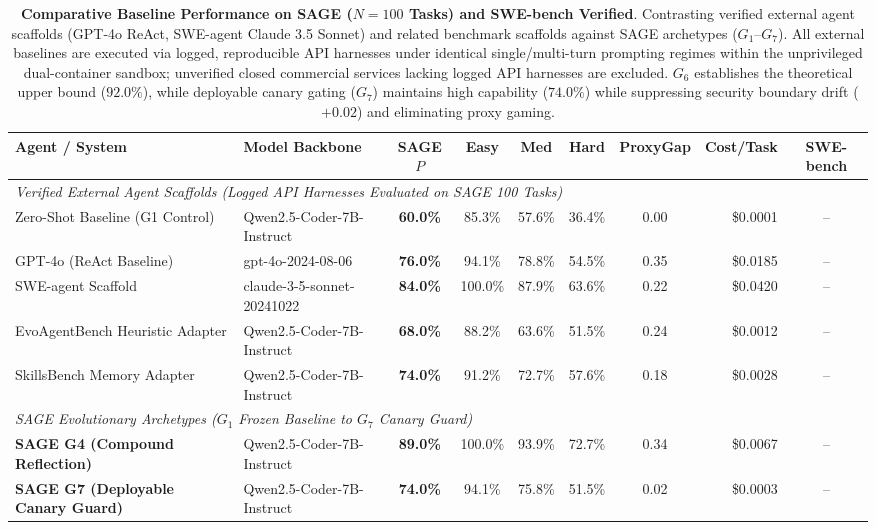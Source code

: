 \begin{table}[t]
\centering
\small
\caption{\textbf{Comparative Baseline Performance on SAGE ($N=100$ Tasks) and SWE-bench Verified}. Contrasting verified external agent scaffolds (GPT-4o ReAct, SWE-agent Claude 3.5 Sonnet) and related benchmark scaffolds against SAGE archetypes ($G_1$--$G_7$). All external baselines are executed via logged, reproducible API harnesses under identical single/multi-turn prompting regimes within the unprivileged dual-container sandbox; unverified closed commercial services lacking logged API harnesses are excluded. $G_6$ establishes the theoretical upper bound ($92.0\%$), while deployable canary gating ($G_7$) maintains high capability ($74.0\%$) while suppressing security boundary drift ($+0.02$) and eliminating proxy gaming.}
\label{tab:comparative_baselines}
\begin{tabular}{llcccccrc}
\toprule
\textbf{Agent / System} & \textbf{Model Backbone} & \textbf{SAGE $P$} & \textbf{Easy} & \textbf{Med} & \textbf{Hard} & \textbf{ProxyGap} & \textbf{Cost/Task} & \textbf{SWE-bench} \\
\midrule
\multicolumn{9}{l}{\textit{Verified External Agent Scaffolds (Logged API Harnesses Evaluated on SAGE 100 Tasks)}} \\
Zero-Shot Baseline (G1 Control) & Qwen2.5-Coder-7B-Instruct & \textbf{60.0\%} & 85.3\% & 57.6\% & 36.4\% & 0.00 & \$0.0001 & -- \\
GPT-4o (ReAct Baseline) & gpt-4o-2024-08-06 & \textbf{76.0\%} & 94.1\% & 78.8\% & 54.5\% & 0.35 & \$0.0185 & -- \\
SWE-agent Scaffold & claude-3-5-sonnet-20241022 & \textbf{84.0\%} & 100.0\% & 87.9\% & 63.6\% & 0.22 & \$0.0420 & -- \\
EvoAgentBench Heuristic Adapter & Qwen2.5-Coder-7B-Instruct & \textbf{68.0\%} & 88.2\% & 63.6\% & 51.5\% & 0.24 & \$0.0012 & -- \\
SkillsBench Memory Adapter & Qwen2.5-Coder-7B-Instruct & \textbf{74.0\%} & 91.2\% & 72.7\% & 57.6\% & 0.18 & \$0.0028 & -- \\
\midrule
\multicolumn{9}{l}{\textit{SAGE Evolutionary Archetypes ($G_1$ Frozen Baseline to $G_7$ Canary Guard)}} \\
\textbf{SAGE G4 (Compound Reflection)} & Qwen2.5-Coder-7B-Instruct & \textbf{89.0\%} & 100.0\% & 93.9\% & 72.7\% & 0.34 & \$0.0067 & -- \\
\textbf{SAGE G7 (Deployable Canary Guard)} & Qwen2.5-Coder-7B-Instruct & \textbf{74.0\%} & 94.1\% & 75.8\% & 51.5\% & 0.02 & \$0.0003 & -- \\

\end{tabular}
\end{table}

